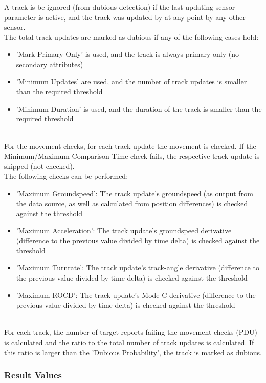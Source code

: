 A track is be ignored (from dubious detection) if the last-updating sensor parameter is active, and the track was updated by at any point by any other sensor. \\

The total track updates are marked as dubious if any of the following cases hold:
\begin{itemize}  
\item 'Mark Primary-Only' is used, and the track is always primary-only (no secondary attributes)
\item 'Minimum Updates' are used, and the number of track updates is smaller than the required threshold
\item 'Minimum Duration' is used, and the duration of the track is smaller than the required threshold
\end{itemize}
\ \\

For the movement checks, for each track update the movement is checked. If the Minimum/Maximum Comparison Time check fails, the respective track update is skipped (not checked). \\ 

The following checks can be performed:
\begin{itemize}  
\item 'Maximum Groundspeed': The track update's groundspeed (as output from the data source, as well as calculated from position differences) is checked against the threshold
\item 'Maximum Acceleration': The track update's groundspeed derivative (difference to the previous value divided by time delta) is checked against the threshold
\item 'Maximum Turnrate': The track update's track-angle derivative (difference to the previous value divided by time delta) is checked against the threshold
\item 'Maximum ROCD': The track update's Mode C derivative (difference to the previous value divided by time delta) is checked against the threshold
\end{itemize}
\ \\

For each track, the number of target reports failing the movement checks (PDU) is calculated and the ratio to the total number of track updates is calculated. If this ratio is larger than the 'Dubious Probability', the track is marked as dubious.

\subsubsection{Result Values}


